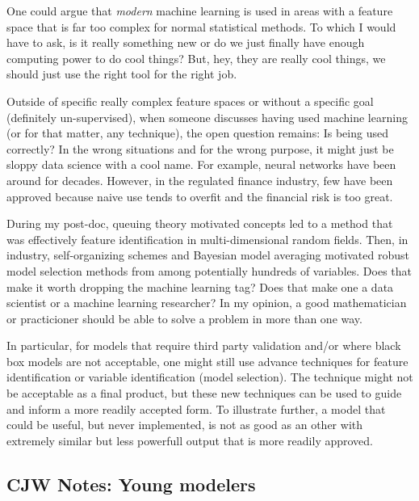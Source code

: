 \documentclass[10pt]{article}
\begin{document}
One could argue that {\em modern} machine learning is used in areas with a feature space that is far too complex for normal statistical
methods.  To which I would have to ask, is it really something new or do we just finally have enough computing power to do cool things?
But, hey, they are really cool things, we should just use the right tool for the right job.

Outside of specific really complex feature spaces or without a specific goal (definitely un-supervised), 
when someone discusses having used machine learning (or for that matter, any technique),
the open question remains: Is being used correctly?  In the wrong situations and for the wrong purpose, it might just be sloppy data
science with a cool name.  For example,  neural networks have been around for decades.  However, in the regulated finance industry, few have
been approved because naive use tends to overfit and the financial risk is too great.

During my post-doc, queuing theory motivated concepts led to a method that was effectively feature identification in
multi-dimensional random fields. Then, in industry, self-organizing schemes and Bayesian model averaging motivated robust model selection
methods from among potentially hundreds of variables.  Does that make it worth dropping the machine learning tag?  Does that make one a data
scientist or a machine learning researcher?  In my opinion, a good mathematician or practicioner should be able to solve a problem in more
than one way.  

In particular, for models that require third party validation and/or where black box models are not acceptable, one might still use advance
techniques for feature identification or variable identification (model selection).  The technique might not be acceptable as a final
product, but these new techniques can be used to guide and inform a more readily accepted form. To illustrate further, a model that could be
useful, but never implemented, is not as good as an other with extremely similar but less powerfull output that is more
readily approved.


\subsection{CJW Notes: Young modelers}
\end{document}
